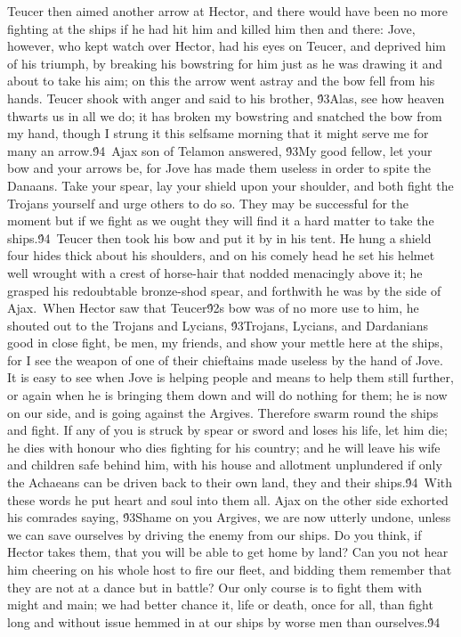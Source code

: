 {Teucer then aimed another arrow at Hector, and there would have been no more fighting at the ships if he had hit him and killed him then and there: Jove, however, who kept watch over Hector, had his eyes on Teucer, and deprived him of his triumph, by breaking his bowstring for him just as he was drawing it and about to take his aim; on this the arrow went astray and the bow fell from his hands. Teucer shook with anger and said to his brother, \'93Alas, see how heaven thwarts us in all we do; it has broken my bowstring and snatched the bow from my hand, though I strung it this selfsame morning that it might serve me for many an arrow.\'94\
Ajax son of Telamon answered, \'93My good fellow, let your bow and your arrows be, for Jove has made them useless in order to spite the Danaans. Take your spear, lay your shield upon your shoulder, and both fight the Trojans yourself and urge others to do so. They may be successful for the moment but if we fight as we ought they will find it a hard matter to take the ships.\'94\
Teucer then took his bow and put it by in his tent. He hung a shield four hides thick about his shoulders, and on his comely head he set his helmet well wrought with a crest of horse-hair that nodded menacingly above it; he grasped his redoubtable bronze-shod spear, and forthwith he was by the side of Ajax.\
When Hector saw that Teucer\'92s bow was of no more use to him, he shouted out to the Trojans and Lycians, \'93Trojans, Lycians, and Dardanians good in close fight, be men, my friends, and show your mettle here at the ships, for I see the weapon of one of their chieftains made useless by the hand of Jove. It is easy to see when Jove is helping people and means to help them still further, or again when he is bringing them down and will do nothing for them; he is now on our side, and is going against the Argives. Therefore swarm round the ships and fight. If any of you is struck by spear or sword and loses his life, let him die; he dies with honour who dies fighting for his country; and he will leave his wife and children safe behind him, with his house and allotment unplundered if only the Achaeans can be driven back to their own land, they and their ships.\'94\
With these words he put heart and soul into them all. Ajax on the other side exhorted his comrades saying, \'93Shame on you Argives, we are now utterly undone, unless we can save ourselves by driving the enemy from our ships. Do you think, if Hector takes them, that you will be able to get home by land? Can you not hear him cheering on his whole host to fire our fleet, and bidding them remember that they are not at a dance but in battle? Our only course is to fight them with might and main; we had better chance it, life or death, once for all, than fight long and without issue hemmed in at our ships by worse men than ourselves.\'94\
}
